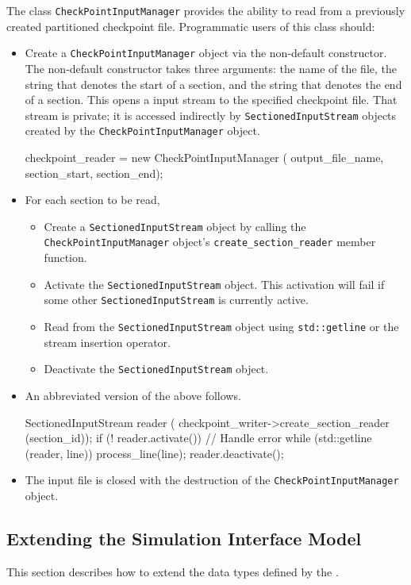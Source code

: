 The class \verb|CheckPointInputManager| provides the ability to read
from a previously created partitioned checkpoint file.
Programmatic users of this class should:
\begin{itemize}
\item Create a \verb|CheckPointInputManager| object via the non-default
constructor. The non-default constructor takes three arguments:
the name of the file,
the string that denotes the start of a section, and
the string that denotes the end of a section.
This opens a \Cplusplus input stream to  the specified checkpoint file.
That stream is private; it is accessed indirectly by
\verb|SectionedInputStream| objects created by the
\verb|CheckPointInputManager| object.
\begin{codeblock}
checkpoint_reader = new CheckPointInputManager (
   output_file_name, section_start, section_end);
\end{codeblock}

\item For each section to be read,
\begin{itemize}
\item Create a \verb|SectionedInputStream| object
by calling the \verb|CheckPointInputManager| object's
\verb|create_section_reader| member function.
\item Activate the \verb|SectionedInputStream| object.
This activation will fail if some other \verb|SectionedInputStream|
is currently active.
\item Read from the \verb|SectionedInputStream| object using
\verb|std::getline| or
the \Cplusplus stream insertion operator.
\item Deactivate the \verb|SectionedInputStream| object.
\end{itemize}
\item An abbreviated version of the above follows.
\begin{codeblock}
SectionedInputStream reader (
   checkpoint_writer->create_section_reader (section_id));
if (! reader.activate()) {
   // Handle error
}
while (std::getline (reader, line)) {
   process_line(line);
}
reader.deactivate();
\end{codeblock}

\item The input file is closed with the destruction of the
\verb|CheckPointInputManager| object.
\end{itemize}


\subsection{Extending the Simulation Interface Model}
This section describes how to extend the data types defined by the
\ModelDesc.


